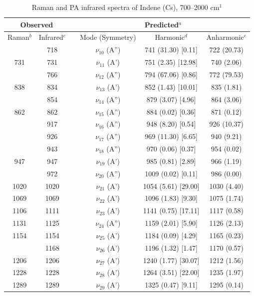 	\begin{table}[H]
		\caption{Raman and PA infrared spectra of Indene (Cs), 700–2000 cm$^{1}$}
		\begin{center}
			\begin{tabular}{c c c c c c}
				\hline
				\multicolumn{ 2}{c}{Observed} & \multicolumn{1}{c}{} & \multicolumn{ 3}{c}{Predicted$^{a}$} \\ \hline
				Raman$^{b}$ & \multicolumn{1}{c}{Infrared$^{c}$} &  & \multicolumn{1}{c}{Mode (Symmetry)} & \multicolumn{1}{c}{Harmonic$^{d}$} & Anharmonic$^{e}$ \\ \hline
\multicolumn{1}{l}{} & \multicolumn{1}{c}{718} &  & $\nu_{10}$ (A”) & 741 (31.30) [0.11] & 722 (20.73) \\ 
731 & \multicolumn{1}{c}{731} &  & $\nu_{11}$ (A’) & 751 (2.35) [12.98] & 740 (2.06) \\ 
\multicolumn{1}{l}{} & \multicolumn{1}{c}{766} &  & $\nu_{12}$ (A”) & 794 (67.06) [0.86] & 772 (79.53) \\ 
838 & 834 &  & $\nu_{13}$ (A’) & 852 (1.43) [10.01] & 835 (1.81) \\ 
\multicolumn{1}{l}{} & 854 &  & $\nu_{14}$ (A”) &    879 (3.07) [4.96] & 864 (3.06) \\ 
862 & 862 &  & $\nu_{15}$ (A”) & 884 (0.02) [0.36] & 871 (0.12) \\ 
\multicolumn{1}{l}{} & 917 &  & $\nu_{16}$ (A”) & 948 (8.20) [0.54] & 926 (10.37) \\ 
\multicolumn{1}{l}{} & 926 &  &     $\nu_{17}$ (A”) & 969 (11.30) [6.65] & 940 (9.21) \\ 
\multicolumn{1}{l}{} & 943 &  & $\nu_{18}$ (A”) & 970 (0.06) [0.37] & 954 (0.02) \\ 
947 & 947 &  & $\nu_{19}$ (A’) & 985 (0.81) [2.89] & 966 (1.19) \\ 
\multicolumn{1}{l}{} & 972 &  & $\nu_{20}$ (A”) & 1009 (0.02) [0.11] & 986 (0.00) \\ 
1020 & 1020 &  & $\nu_{21}$ (A’) & 1054 (5.61) [29.00] & 1030 (4.40) \\ 
1069 & 1069 &  & $\nu_{22}$ (A’) & 1096 (1.83) [9.30] & 1075 (1.74) \\ 
1106 & 1111 &  & $\nu_{23}$ (A’) & 1141 (0.75) [17.11] & 1117 (0.58) \\ 
1131 & 1125 &  & $\nu_{24}$ (A”)
&    1159 (2.01) [5.90] & 1126 (2.13) \\ 
1154 & 1154 &  & $\nu_{25}$ (A’)
& 1184 (0.09) [4.29] & 1165 (0.23) \\ 
\multicolumn{1}{l}{} & 1168 &  & $\nu_{26}$ (A’)
&    1196 (1.32) [1.47] & 1170 (0.57) \\ 
1206 & 1206 &  & $\nu_{27}$ (A’) & 1240 (1.77) [30.07] & 1212 (1.56) \\ 
1228 & 1228 &  & $\nu_{28}$ (A’) & 1264 (3.51) [22.00] & 1235 (1.97) \\ 
1289 & 1289 &  & $\nu_{29}$ (A’)&1325 (0.47) [9.11] & 1295 (0.14)\\ 
\bottomrule
\end{tabular}
\end{center}
\end{table}



